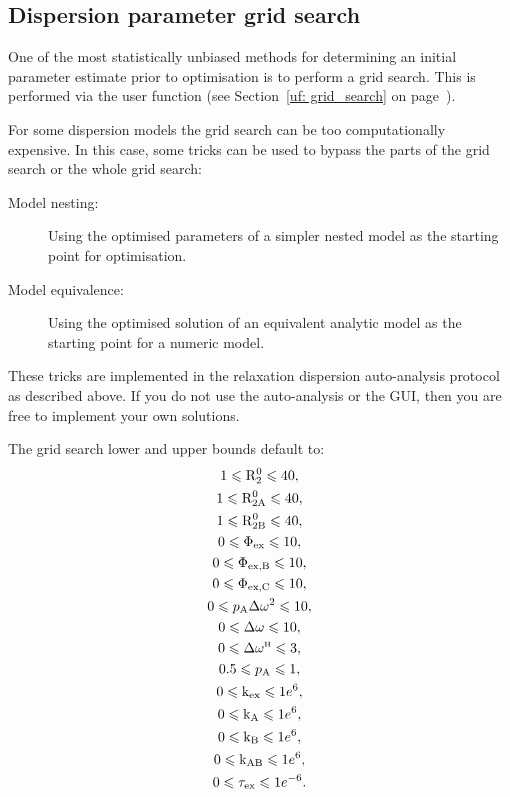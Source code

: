 
\subsection{Dispersion parameter grid search}

One of the most statistically unbiased methods for determining an initial parameter estimate prior to optimisation is to perform a grid search.
This is performed via the  user function (see Section~\ref{uf: grid_search} on page~\pageref{uf: grid_search}).


For some dispersion models the grid search can be too computationally expensive.
In this case, some tricks can be used to bypass the parts of the grid search or the whole grid search:
\begin{description}
\item[Model nesting:]  Using the optimised parameters of a simpler nested model as the starting point for optimisation.
\item[Model equivalence:]  Using the optimised solution of an equivalent analytic model as the starting point for a numeric model.
\end{description}
These tricks are implemented in the relaxation dispersion auto-analysis protocol as described above.
If you do not use the auto-analysis or the GUI, then you are free to implement your own solutions.

The grid search lower and upper bounds default to:
\begin{subequations}
\begin{gather} 
    1 \leqslant \mathrm{R}_2^0 \leqslant 40, \\
    1 \leqslant \mathrm{R}_\mathrm{2A}^0 \leqslant 40, \\
    1 \leqslant \mathrm{R}_\mathrm{2B}^0 \leqslant 40, \\
    0 \leqslant \Phi_\textrm{ex} \leqslant 10, \\
    0 \leqslant \Phi_\textrm{ex,B} \leqslant 10, \\
    0 \leqslant \Phi_\textrm{ex,C} \leqslant 10, \\
    0 \leqslant p_\textrm{A}\Delta\omega^2 \leqslant 10, \\
    0 \leqslant \Delta\omega \leqslant 10, \\
    0 \leqslant \Delta\omega^{\scriptscriptstyle\mathrm{H}} \leqslant 3, \\
    0.5 \leqslant p_\textrm{A} \leqslant 1, \\
    0 \leqslant \textrm{k}_\textrm{ex} \leqslant 1e^6, \\
    0 \leqslant \textrm{k}_\textrm{A} \leqslant 1e^6, \\
    0 \leqslant \textrm{k}_\textrm{B} \leqslant 1e^6, \\
    0 \leqslant \textrm{k}_\textrm{AB} \leqslant 1e^6, \\
    0 \leqslant \tau_\textrm{ex} \leqslant 1e^{-6}.
\end{gather} 
\end{subequations}

